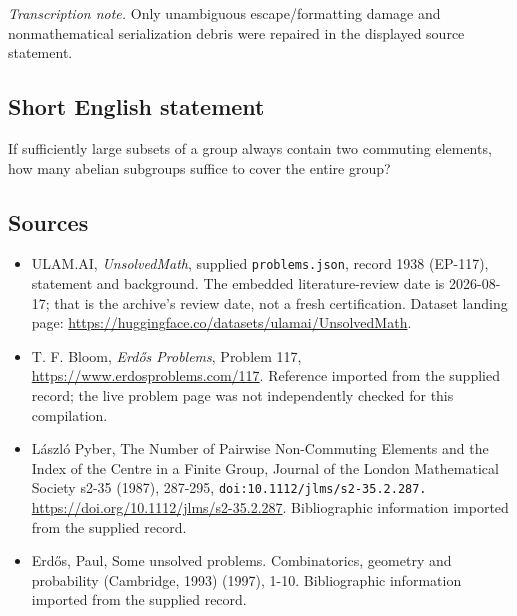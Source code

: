 \documentclass[11pt,a4paper]{article}
\begin{document}
{\small\emph{Transcription note.} Only unambiguous escape/formatting damage and nonmathematical serialization debris were repaired in the displayed source statement.}

\subsection{Short English statement}

If sufficiently large subsets of a group always contain two commuting elements, how many abelian subgroups suffice to cover the entire group?

\subsection{Sources}

{\small

\begin{itemize}

\item[\hypertarget{source:1938:1}{S1}] ULAM.AI, \emph{UnsolvedMath}, supplied \texttt{problems.json}, record 1938 (EP-117), statement and background. The embedded literature-review date is 2026-08-17; that is the archive’s review date, not a fresh certification. Dataset landing page: \url{https://huggingface.co/datasets/ulamai/UnsolvedMath}.

\item[\hypertarget{source:1938:2}{S2}] T. F. Bloom, \emph{Erdős Problems}, Problem 117, \url{https://www.erdosproblems.com/117}. Reference imported from the supplied record; the live problem page was not independently checked for this compilation.

\item[\hypertarget{source:1938:3}{S3}] László Pyber, The Number of Pairwise Non-Commuting Elements and the Index of the Centre in a Finite Group, Journal of the London Mathematical Society s2-35 (1987), 287-295, \nolinkurl{doi:10.1112/jlms/s2-35.2.287.} \url{https://doi.org/10.1112/jlms/s2-35.2.287}. Bibliographic information imported from the supplied record.

\item[\hypertarget{source:1938:4}{S4}] Erd\H{o}s, Paul, Some unsolved problems. Combinatorics, geometry and probability (Cambridge, 1993) (1997), 1-10. Bibliographic information imported from the supplied record.

\end{itemize}

}

\label{end:1938}
\end{document}
